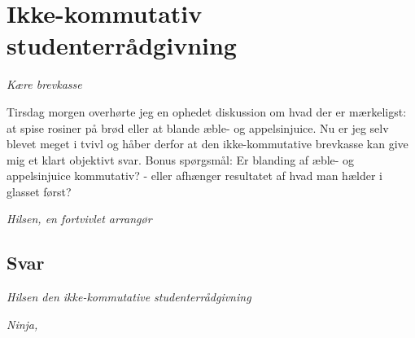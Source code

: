 \begin{minipage}[t]{100mm}
\vspace{3mm}
\section*{Ikke-kommutativ studenterrådgivning}
\emph{Kære brevkasse}

Tirsdag morgen overhørte jeg en ophedet diskussion om hvad der er mærkeligst: at spise rosiner på brød eller at blande æble- og appelsinjuice. Nu er jeg selv blevet meget i tvivl og håber derfor at den ikke-kommutative brevkasse kan give mig et klart objektivt svar. Bonus spørgsmål: Er blanding af æble- og appelsinjuice kommutativ? - eller afhænger resultatet af hvad man hælder i glasset først?
 
\emph{Hilsen, en fortvivlet arrangør}

\subsection*{Svar}

{\flushright\emph{Hilsen den ikke-kommutative studenterrådgivning}}




{\flushright\emph{Ninja, }}


\end{minipage}

